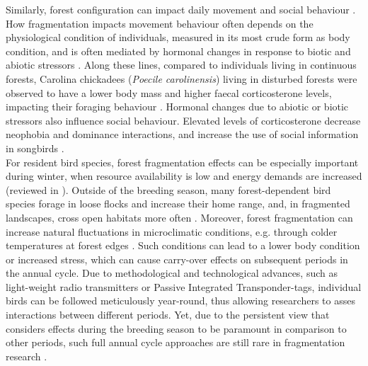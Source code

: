 \documentclass[10pt, twoside]{book} %
\begin{document}
Similarly, forest configuration can impact daily movement and social behaviour \citep{Cosgrove2018, He2019}. How fragmentation impacts movement behaviour often depends on the physiological condition of individuals, measured in its most crude form as body condition, and is often mediated by hormonal changes in response to biotic and abiotic stressors \citep{Goossens2020, Creel2013}. Along these lines, compared to individuals living in continuous forests, Carolina chickadees (\textit{Poecile carolinensis}) living in disturbed forests were observed to have a lower body mass and higher faecal corticosterone levels, impacting their foraging behaviour \citep{Lucas2006}. Hormonal changes due to abiotic or biotic stressors also influence social behaviour. Elevated levels of corticosterone decrease neophobia and dominance interactions, and increase the use of social information in songbirds \citep{Spencer2007, Boogert2013}.\\

For resident bird species, forest fragmentation effects can be especially important during winter, when resource availability is low and energy demands are increased (reviewed in \citealt{Williams2015}). Outside of the breeding season, many forest-dependent bird species forage in loose flocks and increase their home range, and, in fragmented landscapes, cross open habitats more often \citep{Kattan1994, Maldonado-Coelho2004}. Moreover, forest fragmentation can increase natural fluctuations in microclimatic conditions, e.g. through colder temperatures at forest edges \citep{Latimer2017}. Such conditions can lead to a lower body condition or increased stress, which can cause carry-over effects on subsequent periods in the annual cycle. Due to methodological and technological advances, such as light-weight radio transmitters or Passive Integrated Transponder-tags, individual birds can be followed meticulously year-round, thus allowing researchers to asses interactions between different periods. Yet, due to the persistent view that considers effects during the breeding season to be paramount in comparison to other periods, such full annual cycle approaches are still rare in fragmentation research \citep{Marra2015}.\\
\end{document}
